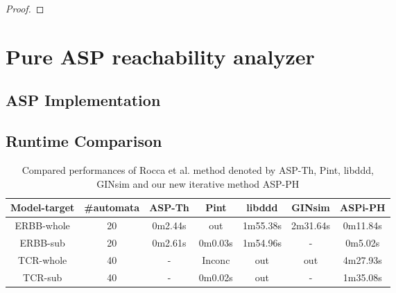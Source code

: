 \begin{theorem}\label{th:underapprox}
    \begin{proof}
    \end{proof}
\end{theorem}



\chapter{Pure ASP reachability analyzer}
\section{ASP Implementation}
\section{Runtime Comparison}
\cite{abdallah2015exhaustive}
\begin{table}[ht]
    \centering
    \footnotesize
    \begin{tabular}{c|c|c|c|c|c|c}
        Model-target & \#automata & ASP-Th & Pint & libddd & GINsim & ASPi-PH\\
        \hline
        ERBB-whole & 20& 0m2.44s& out& 1m55.38s& 2m31.64s& 0m11.84s\\
        \hline
        ERBB-sub& 20& 0m2.61s& 0m0.03s& 1m54.96s& -& 0m5.02s\\
        \hline
        TCR-whole& 40& - &Inconc& out& out& 4m27.93s\\
        \hline
        TCR-sub& 40 &- &0m0.02s& out& -& 1m35.08s
    \end{tabular}
    \caption[Performance of pure ASP method]{Compared performances of Rocca et al. method \cite{rocca2014asp} denoted by ASP-Th, Pint, libddd, GINsim and our new iterative method ASP-PH}
    \label{tab:pureAsp}
\end{table}